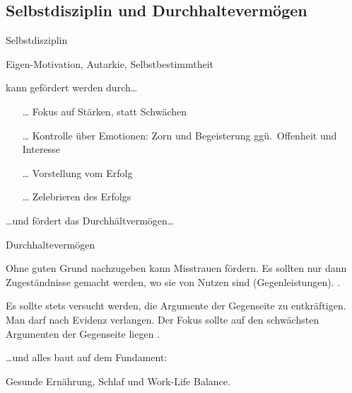 \subsection{Selbstdisziplin und Durchhaltevermögen}

\begin{frame}{Selbstdisziplin}

  Eigen-Motivation, Autarkie, Selbstbestimmtheit

  kann gefördert werden durch\ldots
  \begin{itemize}
    \item[\ldots]Fokus auf Stärken, statt Schwächen 
    \item[\ldots]Kontrolle über Emotionen: Zorn und Begeisterung ggü. Offenheit und Interesse
    \item[\ldots]Vorstellung vom Erfolg 
    \item[\ldots]Zelebrieren des Erfolgs 
  \end{itemize}

  \ldots und fördert das Durchhältvermögen\ldots

\end{frame}

\begin{frame}{Durchhaltevermögen}

Ohne guten Grund nachzugeben kann Misstrauen fördern. Es sollten nur dann Zugeständnisse gemacht werden, wo sie von Nutzen sind (Gegenleistungen). \cites{obermeier_karrieresprung_nodate}[ch. 4.5.2]{helmold_verhandlungskonzepte_2019}.

  Es sollte stets versucht werden, die Argumente der Gegenseite zu entkräftigen. Man darf nach Evidenz verlangen. Der Fokus sollte auf den schwächsten Argumenten der Gegenseite liegen \cite[][ch. 4.5.2]{helmold_verhandlungskonzepte_2019}.

\end{frame}

\begin{frame}

  \ldots und alles baut auf dem Fundament:
  
  Gesunde Ernährung, Schlaf und Work-Life Balance.

\end{frame}


